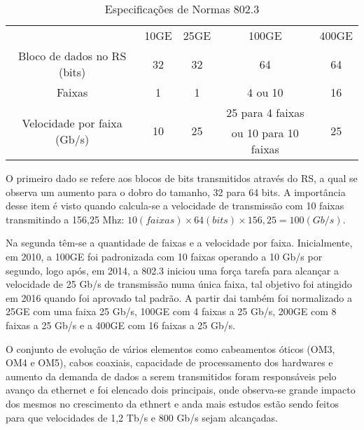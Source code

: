 \documentclass[a4paper,12pt]{article}
\begin{document}
\begin{center}
	\begin{table}[h!]
	\centering
		\begin{tabular}{ | c | c | c | c | c | }
			\hline
			& \multirow{2}{*}{10GE} & \multirow{2}{*}{25GE} & \multirow{2}{*}{100GE} & \multirow{2}{*}{400GE} \\
			& & & & \\
			\hline
			Bloco de dados no RS (bits) & 32 & 32 & 64 & 64 \\
			\hline
			Faixas & 1 & 1 & 4 ou 10 & 16 \\
			\hline
			\multirow{2}{*}{Velocidade por faixa (Gb/s)} & \multirow{2}{*}{10} & \multirow{2}{*}{25} &  25 para 4 faixas & \multirow{2}{*}{25} \\
			& & & ou 10 para 10 faixas & \\
			\hline
		\end{tabular}
		\centering
		\captionsetup{labelformat=empty} 
		\caption{Especificações de Normas 802.3}
	\end{table}
	
\end{center}

O primeiro dado se refere aos blocos de bits transmitidos através do RS, a qual se observa um aumento para o dobro do tamanho, 32 para 64 bits. A importância desse item é visto quando calcula-se a velocidade de transmissão com 10 faixas transmitindo a 156,25 Mhz:
$10(faixas) \times 64(bits) \times 156,25 = 100 (Gb/s)$.

Na segunda têm-se a quantidade de faixas e a velocidade por faixa. Inicialmente, em 2010, a 100GE foi padronizada com 10 faixas operando a 10 Gb/s por segundo, logo após, em 2014, a 802.3 iniciou uma força tarefa para alcançar a velocidade de 25 Gb/s de transmissão numa única faixa, tal objetivo foi atingido em 2016 quando foi aprovado tal padrão. A partir dai também foi normalizado a 25GE com uma faixa 25 Gb/s, 100GE com 4 faixas a 25 Gb/s, 200GE com 8 faixas a 25 Gb/s e a 400GE com 16 faixas a 25 Gb/s.

O conjunto de evolução de vários elementos como cabeamentos óticos (OM3, OM4 e OM5), cabos coaxiais, capacidade de processamento dos hardwares e aumento da demanda de dados a serem transmitidos foram responsáveis pelo avanço da ethernet e foi elencado dois principais, onde observa-se grande impacto dos mesmos no crescimento da ethnert e anda mais estudos estão sendo feitos para que velocidades de 1,2 Tb/s e 800 Gb/s sejam alcançadas.
\end{document}
